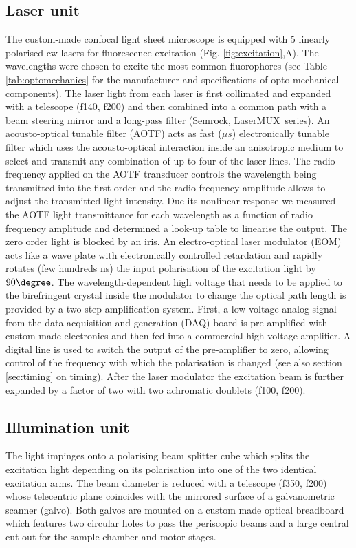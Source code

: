 \documentclass[12pt]{spieman}  %
\begin{document}
\subsection{Laser unit}		
The custom-made confocal light sheet microscope is equipped with 5 linearly polarised cw lasers for fluorescence excitation (Fig. \ref{fig:excitation},A). The wavelengths were chosen to excite the most common fluorophores (see Table \ref{tab:optomechanics} for the manufacturer and specifications of opto-mechanical components). The laser light from each laser is first collimated and expanded with a telescope (f140, f200) and then combined into a common path with a beam steering mirror and a long-pass filter (Semrock, LaserMUX\texttrademark\ series). An acousto-optical tunable filter (AOTF) acts as fast ($\mu s$) electronically tunable filter which uses the acousto-optical interaction inside an anisotropic medium to select and transmit any combination of up to four of the laser lines. The radio-frequency applied on the AOTF transducer controls the wavelength being transmitted into the first order and the radio-frequency amplitude allows to adjust the transmitted light intensity. Due its nonlinear response we measured the AOTF light transmittance for each wavelength as a function of radio frequency amplitude and determined a look-up table to linearise the output. The zero order light is blocked by an iris. An electro-optical laser modulator (EOM) acts like a wave plate with electronically controlled retardation and rapidly rotates (few hundreds ns) the input polarisation of the excitation light by $90\degree$. The wavelength-dependent high voltage that needs to be applied to the birefringent crystal inside the modulator to change the optical path length is provided by a two-step amplification system. First, a low voltage analog signal from the data acquisition and generation (DAQ) board is pre-amplified with custom made electronics and then fed into a commercial high voltage amplifier. A digital line is used to switch the output of the pre-amplifier to zero, allowing control of the frequency with which the polarisation is changed (see also section \ref{sec:timing} on timing). After the laser modulator the excitation beam is further expanded by a factor of two with two achromatic doublets (f100, f200). 

\subsection{Illumination unit}		
The light impinges onto a polarising beam splitter cube which splits the excitation light depending on its polarisation into one of the two identical excitation arms. The beam diameter is reduced with a telescope (f350, f200) whose telecentric plane coincides with the mirrored surface of a galvanometric scanner (galvo). Both galvos are mounted on a custom made optical breadboard which features two circular holes to pass the periscopic beams and a large central cut-out for the sample chamber and motor stages. 
\end{document}
